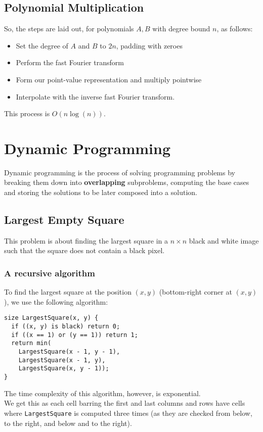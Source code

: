 \documentclass[a4paper, 12pt, twoside]{article}
\begin{document}
\subsection{Polynomial Multiplication}

So, the steps are laid out, for polynomials $A, B$ with degree bound 
$n$, as follows: \begin{itemize}
  \item Set the degree of $A$ and $B$ to $2n$, padding with zeroes
  \item Perform the fast Fourier transform
  \item Form our point-value representation and multiply pointwise
  \item Interpolate with the inverse fast Fourier transform.
\end{itemize} This process is $O(n \log(n))$.

\vfill

\section{Dynamic Programming}

Dynamic programming is the process of solving programming problems
by breaking them down into \textbf{overlapping} subproblems,
computing the base cases and storing the solutions to be later
composed into a solution.

\newpage

\subsection{Largest Empty Square}

This problem is about finding the largest square in a $n \times n$
black and white image such that the square does not contain a black
pixel.

\subsubsection{A recursive algorithm}

To find the largest square at the position $(x, y)$ 
(bottom-right corner at $(x, y)$), we use the
following algorithm: \begin{lstlisting}
size LargestSquare(x, y) {
  if ((x, y) is black) return 0;
  if ((x == 1) or (y == 1)) return 1;
  return min(
    LargestSquare(x - 1, y - 1),
    LargestSquare(x - 1, y),
    LargestSquare(x, y - 1));
}
\end{lstlisting} The time complexity of this algorithm, however,
is exponential.
\\[\baselineskip]
We get this as each cell barring the first and last columns and rows 
have cells where \texttt{LargestSquare} is computed three times 
(as they  are checked from below, to the right, and below and to 
the right).
\end{document}
